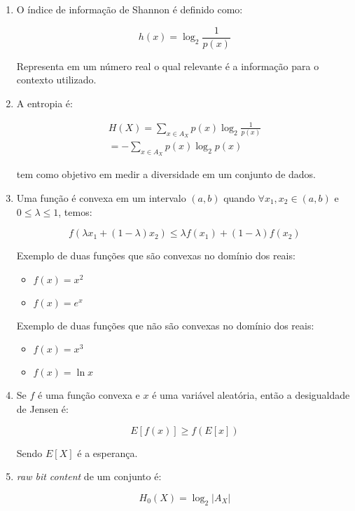\begin{enumerate}
	\item
	O índice de informação de Shannon é definido como:
	
	\[ h(x) = {\log _2}\frac{1}{{p(x)}} \]
	
	Representa em um número real o qual relevante é a informação para o contexto utilizado.
	
	\item
	A entropia é:
	
	\[\begin{array}{l}
    \displaystyle H(X) = \sum\limits_{x \in {A_X}} {p(x){{\log }_2}\frac{1}{{p(x)}}} \\
    \displaystyle =  - \sum\limits_{x \in {A_X}} {p(x){{\log }_2}p(x)} 
    \end{array}\]
	
	tem como objetivo em medir a diversidade em um conjunto de dados.
	
	\item
	Uma função é convexa em um intervalo $(a, b)$ quando  $\forall x_1, x_2 \in (a, b)$ e $0 \le \lambda \le 1$, temos:
	
	\[f(\lambda {x_1} + (1 - \lambda ){x_2}) \le \lambda f({x_1}) + (1 - \lambda )f({x_2})\]
	
	Exemplo de duas funções que são convexas no domínio dos reais:
	
	\begin{itemize}
	    \item $f(x) = x^2$
	    \item $f(x) = e^x$
	\end{itemize}
	
	Exemplo de duas funções que não são convexas no domínio dos reais:
	
	\begin{itemize}
	    \item $f(x) = x^3$
	    \item $f(x) = \ln x$
	\end{itemize}
	
	\item
	Se $f$ é uma função convexa e $x$ é uma variável aleatória, então a desigualdade de Jensen é:
	
	\[E\left[ {f(x)} \right] \ge f\left( {E[x]} \right)\]
	
	Sendo $E[X]$ é a esperança.
	
	\item
	\textit{raw bit content} de um conjunto é:
	
	\[{H_0}(X) = {\log _2}|{A_X}|\]
	

\end{enumerate}

